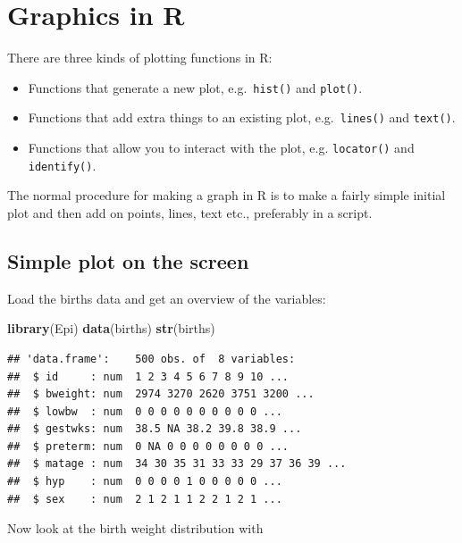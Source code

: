 \documentclass[
]{book}
\newenvironment{Shaded}{\begin{snugshade}}{\end{snugshade}}
\newcommand{\FunctionTok}[1]{\textcolor[rgb]{0.13,0.29,0.53}{\textbf{#1}}}
\newcommand{\NormalTok}[1]{#1}
\newcommand{\SpecialCharTok}[1]{\textcolor[rgb]{0.81,0.36,0.00}{\textbf{#1}}}
\providecommand{\tightlist}{%
  \setlength{\itemsep}{0pt}\setlength{\parskip}{0pt}}
\begin{document}
\chapter{Graphics in R}\label{graphics-in-r}

There are three kinds of plotting functions in R:

\begin{itemize}
\tightlist
\item
  Functions that generate a new plot, e.g.~\texttt{hist()} and
  \texttt{plot()}.
\item
  Functions that add extra things to an existing plot,
  e.g.~\texttt{lines()} and \texttt{text()}.
\item
  Functions that allow you to interact with the plot, e.g.
  \texttt{locator()} and \texttt{identify()}.
\end{itemize}

The normal procedure for making a graph in R is to make a fairly
simple initial plot and then add on points, lines, text etc.,
preferably in a script.

\section{Simple plot on the screen}\label{simple-plot-on-the-screen}

Load the births data and get an overview of the variables:

\begin{Shaded}
\begin{Highlighting}[]
\FunctionTok{library}\NormalTok{(Epi)}
\FunctionTok{data}\NormalTok{(births)}
\FunctionTok{str}\NormalTok{(births)}
\end{Highlighting}
\end{Shaded}

\begin{verbatim}
## 'data.frame':    500 obs. of  8 variables:
##  $ id     : num  1 2 3 4 5 6 7 8 9 10 ...
##  $ bweight: num  2974 3270 2620 3751 3200 ...
##  $ lowbw  : num  0 0 0 0 0 0 0 0 0 0 ...
##  $ gestwks: num  38.5 NA 38.2 39.8 38.9 ...
##  $ preterm: num  0 NA 0 0 0 0 0 0 0 0 ...
##  $ matage : num  34 30 35 31 33 33 29 37 36 39 ...
##  $ hyp    : num  0 0 0 0 1 0 0 0 0 0 ...
##  $ sex    : num  2 1 2 1 1 2 2 1 2 1 ...
\end{verbatim}

Now look at the birth weight distribution with

\begin{Shaded}
\end{Shaded}
\end{document}
